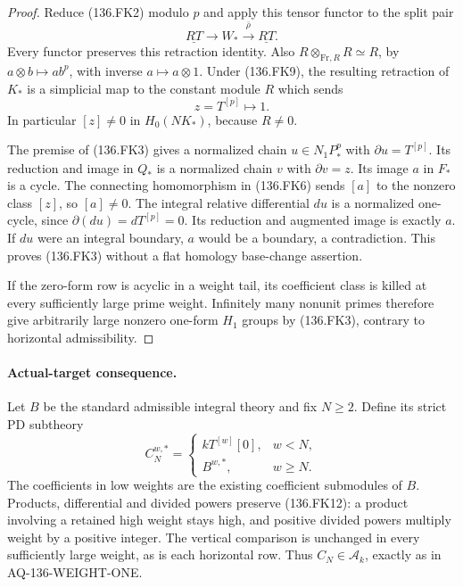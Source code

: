 \begin{proof}
Reduce (136.FK2) modulo $p$ and apply this tensor functor
to the split pair
\[
          \underline{RT}\longrightarrow W_*
                                \xrightarrow{\bar\rho}\underline{RT}.
                                                               \tag{136.FK10}
\]
Every functor preserves this retraction identity. Also
$R\otimes_{\mathrm{Fr},R}R\simeq R$, by
$a\otimes b\mapsto ab^p$, with inverse $a\mapsto a\otimes1$.
Under (136.FK9), the resulting retraction of $K_*$
is a simplicial map to the constant module $R$ which sends
\[
                           z=T^{[p]}\longmapsto1.
                                                               \tag{136.FK11}
\]
In particular $[z]\ne0$ in $H_0(NK_*)$, because $R\ne0$.

The premise of (136.FK3) gives a normalized chain
$u\in N_1P_*^p$ with $\partial u=T^{[p]}$.
Its reduction and image in $Q_*$ is a normalized chain
$v$ with $\partial v=z$. Its image $a$ in $F_*$
is a cycle. The connecting homomorphism in (136.FK6) sends
$[a]$ to the nonzero class $[z]$, so $[a]\ne0$.
The integral relative differential $du$ is a normalized
one-cycle, since $\partial(du)=dT^{[p]}=0$.
Its reduction and augmented image is exactly $a$.
If $du$ were an integral boundary, $a$ would be a boundary,
a contradiction. This proves (136.FK3) without a flat
homology base-change assertion.

If the zero-form row is acyclic in a weight tail, its
coefficient class is killed at every sufficiently large
prime weight. Infinitely many nonunit primes therefore
give arbitrarily large nonzero one-form $H_1$ groups by
(136.FK3), contrary to horizontal admissibility.
\end{proof}

\paragraph{Actual-target consequence.}
Let $B$ be the standard admissible integral theory and fix
$N\ge2$. Define its strict PD subtheory
\[
 C_N^{w,*}=
 \begin{cases}
  kT^{[w]}[0],&w<N,\\
  B^{w,*},&w\ge N.
 \end{cases}                                               \tag{136.FK12}
\]
The coefficients in low weights are the existing coefficient
submodules of $B$. Products, differential and divided powers
preserve (136.FK12): a product involving a retained high
weight stays high, and positive divided powers multiply
weight by a positive integer. The vertical comparison is
unchanged in every sufficiently large weight, as is each
horizontal row. Thus $C_N\in\mathcal A_k$, exactly as in
AQ-136-WEIGHT-ONE.

